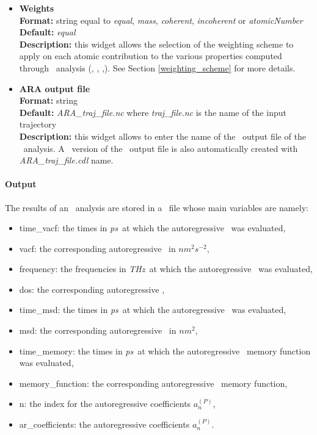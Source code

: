 \documentclass[a4paper,11pt]{report}
\newcommand{\nmsquare}{$nm^2$}
\newcommand{\vacfunits}{$nm^2s^{-2}$}
\newcommand{\ps}{\textit{ps}}
\newcommand{\thz}{\textit{THz}}
\begin{document}
\begin{itemize}
\item \textbf{Weights}\\
\textbf{Format:} string equal to \textit{equal}, \textit{mass}, \textit{coherent}, \textit{incoherent} or \textit{atomicNumber}\\
\textbf{Default:} \textit{equal}\\
\textbf{Description:} this widget allows the selection of the weighting scheme to apply on each atomic contribution 
to the various properties computed through \ARA\ analysis (\MSD , \VACF , \DOS ,). See Section \ref{weighting_scheme} for more 
details. 

\item \textbf{ARA output file}\\
\textbf{Format:} string\\
\textbf{Default:} \textit{ARA\_traj\_file.nc} where \textit{traj\_file.nc} is the name of the input trajectory\\
\textbf{Description:} this widget allows to enter the name of the \NetCDF\ output file of the \ARA\ analysis. A \CDL\ 
version of the \NetCDF\ output file is also automatically created with \textit{ARA\_traj\_file.cdl} name.
\end{itemize}

\paragraph{Output\\}
The results of an \ARA\ analysis are stored in a \NetCDF\ file whose main variables are namely:
\begin{itemize}
\item time\_vacf: the times in \ps\ at which the autoregressive \VACF\ was evaluated,
\item vacf: the corresponding autoregressive \VACF\ in \vacfunits ,
\item frequency: the frequencies in \thz\ at which the autoregressive \DOS\ was evaluated,
\item dos: the corresponding autoregressive \DOS,
\item time\_msd: the times in \ps\ at which the autoregressive \MSD\ was evaluated,
\item msd: the corresponding autoregressive \MSD\ in \nmsquare ,
\item time\_memory: the times in \ps\ at which the autoregressive \VACF\ memory function was evaluated,
\item memory\_function: the corresponding autoregressive \VACF\ memory function,
\item n: the index for the autoregressive coefficients $a_n^{(P)}$,
\item ar\_coefficients: the autoregressive coefficients $a_n^{(P)}$.
\end{itemize}
\end{document}
